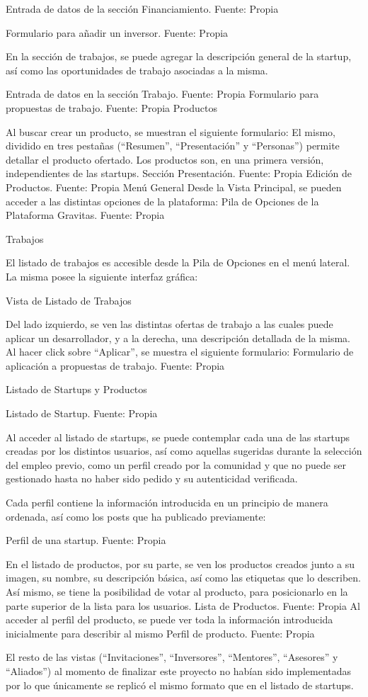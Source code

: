 Entrada de datos de la sección Financiamiento. Fuente: Propia


Formulario para añadir un inversor. Fuente: Propia

En la sección de trabajos, se puede agregar la descripción general de la startup, así como las oportunidades de trabajo asociadas a la misma.

Entrada de datos en la sección Trabajo. Fuente: Propia
Formulario para propuestas de trabajo. Fuente: Propia
Productos

Al buscar crear un producto, se muestran el siguiente formulario:
El mismo, dividido en tres pestañas (“Resumen”, “Presentación” y “Personas”) permite detallar el producto ofertado. Los productos son, en una primera versión, independientes de las startups.
Sección Presentación. Fuente: Propia
Edición de Productos. Fuente: Propia
Menú General
Desde la Vista Principal, se pueden acceder a las distintas opciones de la plataforma:
Pila de Opciones de la Plataforma Gravitas. Fuente: Propia


Trabajos

El listado de trabajos es accesible desde la Pila de Opciones en el menú lateral. La misma posee la siguiente interfaz gráfica:

Vista de Listado de Trabajos

Del lado izquierdo, se ven las distintas ofertas de trabajo a las cuales puede aplicar un desarrollador, y a la derecha, una descripción detallada de la misma. Al hacer click sobre “Aplicar”, se muestra el siguiente formulario:
Formulario de aplicación a propuestas de trabajo. Fuente: Propia

Listado de Startups y Productos

Listado de Startup. Fuente: Propia

Al acceder al listado de startups, se puede contemplar cada una de las startups creadas por los distintos usuarios, así como aquellas sugeridas durante la selección del empleo previo, como un perfil creado por la comunidad y que no puede ser gestionado hasta no haber sido pedido y su autenticidad verificada.

Cada perfil contiene la información introducida en un principio de manera ordenada, así como los posts que ha publicado previamente:

Perfil de una startup. Fuente: Propia

En el listado de productos, por su parte, se ven los productos creados junto a su imagen, su nombre, su descripción básica, así como las etiquetas que lo describen. Así mismo, se tiene la posibilidad de votar al producto, para posicionarlo en la parte superior de la lista para los usuarios.
Lista de Productos. Fuente: Propia
Al acceder al perfil del producto, se puede ver toda la información introducida inicialmente para describir al mismo
Perfil de producto. Fuente: Propia

El resto de las vistas (“Invitaciones”, “Inversores”, “Mentores”, “Asesores” y “Aliados”) al momento de finalizar este proyecto no habían sido implementadas por lo que únicamente se replicó el mismo formato que en el listado de startups.

